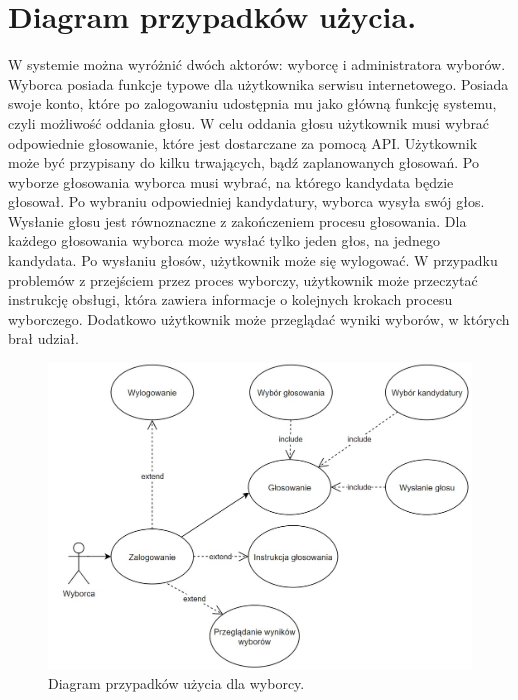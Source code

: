 \documentclass[a4paper,13pt]{report}
\begin{document}
\section{Diagram przypadków użycia.}

W systemie można wyróżnić dwóch aktorów: wyborcę i administratora wyborów. Wyborca posiada funkcje typowe dla użytkownika serwisu internetowego. Posiada swoje konto, które po zalogowaniu udostępnia mu jako główną funkcję systemu, czyli możliwość oddania głosu. W celu oddania głosu użytkownik musi wybrać odpowiednie głosowanie, które jest dostarczane za pomocą API. Użytkownik może być przypisany do kilku trwających, bądź zaplanowanych głosowań. Po wyborze głosowania wyborca musi wybrać, na którego kandydata będzie głosował. Po wybraniu odpowiedniej kandydatury, wyborca wysyła swój głos. Wysłanie głosu jest równoznaczne z zakończeniem procesu głosowania. Dla każdego głosowania wyborca może wysłać tylko jeden głos, na jednego kandydata. Po wysłaniu głosów, użytkownik może się wylogować. W przypadku problemów z przejściem przez proces wyborczy, użytkownik może przeczytać instrukcję obsługi, która zawiera informacje o kolejnych krokach procesu wyborczego. Dodatkowo użytkownik może przeglądać wyniki wyborów, w których brał udział.

\begin{figure}[h]
    \centering
    \includegraphics[scale=0.4]{images/user_use_case.jpg}
    \caption{Diagram przypadków użycia dla wyborcy.}
\end{figure}

\newpage
\end{document}
